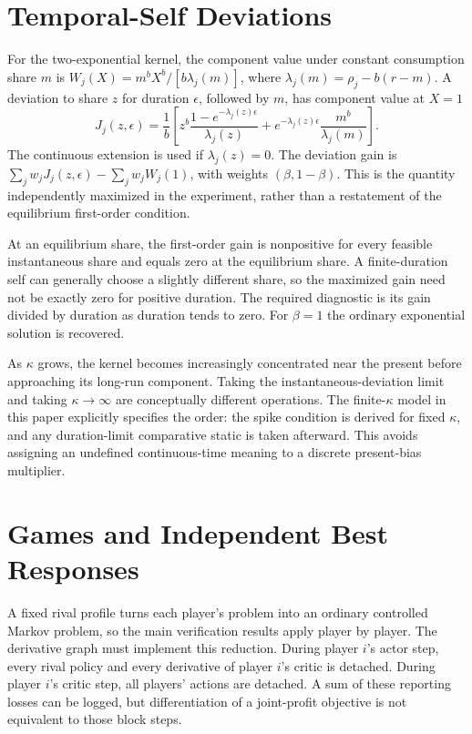 \documentclass[ecta,draft]{econsocart}
\theoremstyle{definition}
\theoremstyle{remark}
\begin{document}
\section{Temporal-Self Deviations}
For the two-exponential kernel, the component value under constant consumption share $m$ is $W_j(X)=m^bX^b/[b\lambda_j(m)]$, where $\lambda_j(m)=\rho_j-b(r-m)$. A deviation to share $z$ for duration $\epsilon$, followed by $m$, has component value at $X=1$
\[
 J_j(z,\epsilon)=\frac1b\left[
 z^b\frac{1-e^{-\lambda_j(z)\epsilon}}{\lambda_j(z)}
 +e^{-\lambda_j(z)\epsilon}\frac{m^b}{\lambda_j(m)}\right].
\]
The continuous extension is used if $\lambda_j(z)=0$. The deviation gain is $\sum_jw_jJ_j(z,\epsilon)-\sum_jw_jW_j(1)$, with weights $(\beta,1-\beta)$. This is the quantity independently maximized in the experiment, rather than a restatement of the equilibrium first-order condition.

At an equilibrium share, the first-order gain is nonpositive for every feasible instantaneous share and equals zero at the equilibrium share. A finite-duration self can generally choose a slightly different share, so the maximized gain need not be exactly zero for positive duration. The required diagnostic is its gain divided by duration as duration tends to zero. For $\beta=1$ the ordinary exponential solution is recovered.

As $\kappa$ grows, the kernel becomes increasingly concentrated near the present before approaching its long-run component. Taking the instantaneous-deviation limit and taking $\kappa\to\infty$ are conceptually different operations. The finite-$\kappa$ model in this paper explicitly specifies the order: the spike condition is derived for fixed $\kappa$, and any duration-limit comparative static is taken afterward. This avoids assigning an undefined continuous-time meaning to a discrete present-bias multiplier.

\section{Games and Independent Best Responses}
A fixed rival profile turns each player's problem into an ordinary controlled Markov problem, so the main verification results apply player by player. The derivative graph must implement this reduction. During player $i$'s actor step, every rival policy and every derivative of player $i$'s critic is detached. During player $i$'s critic step, all players' actions are detached. A sum of these reporting losses can be logged, but differentiation of a joint-profit objective is not equivalent to those block steps.
\end{document}

